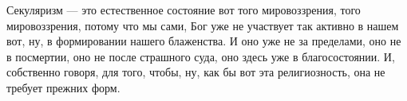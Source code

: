 
Секуляризм — это естественное состояние вот того мировоззрения, того
мировоззрения, потому что мы сами, Бог уже не участвует так активно в нашем вот,
ну, в формировании нашего блаженства. И оно уже не за пределами, оно не в
посмертии, оно не после страшного суда, оно здесь уже в благосостоянии. И,
собственно говоря, для того, чтобы, ну, как бы вот эта религиозность, она не
требует прежних форм. 

